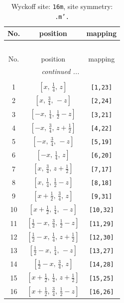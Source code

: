 \documentclass[fleqn,8pt]{jsarticle}
\begin{document}
\renewcommand{\arraystretch}{1.2}
\begin{longtable}{ccc}
\caption{Wyckoff site: {\tt 16m}, site symmetry: {\tt .m'.}}
 \\
 \hline \hline
No. & position & mapping \\ \hline \endfirsthead

\multicolumn{2}{l}{\tablename\ \thetable{}} \\
 \hline \hline
No. & position & mapping \\ \hline \endhead

 \hline \hline
\multicolumn{2}{r}{\footnotesize\it continued ...} \\ \endfoot

 \hline \hline
\multicolumn{2}{r}{} \\ \endlastfoot

1 & $\left[ x,\, \frac{1}{4},\, z \right]$ & {\tt [1,23]} \\ \hline
2 & $\left[ x,\, \frac{3}{4},\, - z \right]$ & {\tt [2,24]} \\ \hline
3 & $\left[ - x,\, \frac{1}{4},\, \frac{1}{2} - z \right]$ & {\tt [3,21]} \\ \hline
4 & $\left[ - x,\, \frac{3}{4},\, z + \frac{1}{2} \right]$ & {\tt [4,22]} \\ \hline
5 & $\left[ - x,\, \frac{3}{4},\, - z \right]$ & {\tt [5,19]} \\ \hline
6 & $\left[ - x,\, \frac{1}{4},\, z \right]$ & {\tt [6,20]} \\ \hline
7 & $\left[ x,\, \frac{3}{4},\, z + \frac{1}{2} \right]$ & {\tt [7,17]} \\ \hline
8 & $\left[ x,\, \frac{1}{4},\, \frac{1}{2} - z \right]$ & {\tt [8,18]} \\ \hline
9 & $\left[ x + \frac{1}{2},\, \frac{3}{4},\, z \right]$ & {\tt [9,31]} \\ \hline
10 & $\left[ x + \frac{1}{2},\, \frac{1}{4},\, - z \right]$ & {\tt [10,32]} \\ \hline
11 & $\left[ \frac{1}{2} - x,\, \frac{3}{4},\, \frac{1}{2} - z \right]$ & {\tt [11,29]} \\ \hline
12 & $\left[ \frac{1}{2} - x,\, \frac{1}{4},\, z + \frac{1}{2} \right]$ & {\tt [12,30]} \\ \hline
13 & $\left[ \frac{1}{2} - x,\, \frac{1}{4},\, - z \right]$ & {\tt [13,27]} \\ \hline
14 & $\left[ \frac{1}{2} - x,\, \frac{3}{4},\, z \right]$ & {\tt [14,28]} \\ \hline
15 & $\left[ x + \frac{1}{2},\, \frac{1}{4},\, z + \frac{1}{2} \right]$ & {\tt [15,25]} \\ \hline
16 & $\left[ x + \frac{1}{2},\, \frac{3}{4},\, \frac{1}{2} - z \right]$ & {\tt [16,26]} \\
\end{longtable}
\end{document}
